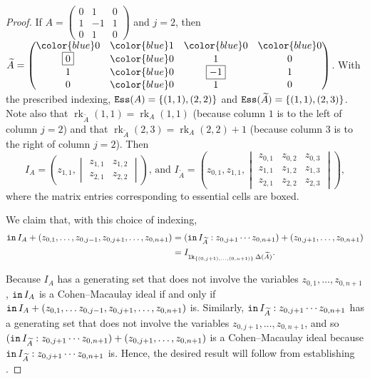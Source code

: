 \documentclass[12 pt]{amsart}
\DeclareMathOperator{\init}{{\tt in}}
\DeclareMathOperator{\lk}{{\tt lk}}
\DeclareMathOperator{\ess}{{\tt Ess}}
\DeclareMathOperator{\rk}{rk}
\theoremstyle{plain}
\newenvironment{example}
  {\pushQED{\qed}\renewcommand{\qedsymbol}{$\diamondsuit$}\examplex}
  {\popQED\endexamplex}
\theoremstyle{definition}
\theoremstyle{remark}
\begin{document}
{\begin{proof}
    \begin{example}
If $A = \begin{pmatrix}
        \boxed{0} & 1 & 0\\
        1 & \boxed{-1} & 1\\
        0 & 1 & 0
    \end{pmatrix}$ and $j=2$, then $\widetilde{A} = \begin{pmatrix}
          {\color{blue}0} & {\color{blue}1} & {\color{blue}0} & {\color{blue}0}\\
        \boxed{0} & {\color{blue}0} & 1 &  0\\
         1 & {\color{blue}0} & \boxed{-1}  & 1\\
        0 & {\color{blue}0} & 1  & 0
    \end{pmatrix}$.  With the prescribed indexing, $\ess(A) = \{(1,1),(2,2)\}$ and $\ess(\widetilde{A}) = \{(1,1),(2,3)\}$.  Note also that $\rk_{\widetilde{A}}(1,1) =\rk_A(1,1)$ (because column $1$ is to the left of column $j=2$) and that $\rk_{\widetilde{A}}(2,3) = \rk_A(2,2)+1$ (because column $3$ is to the right of column $j=2$).  Then \[
    I_A = \left(z_{1,1}, \begin{vmatrix} 
z_{1,1} & z_{1,2}\\
z_{2,1} & z_{2,2}
    \end{vmatrix}\right) \mbox{, and } I_{\widetilde{A}} = \left(z_{0,1},z_{1,1}, \begin{vmatrix} 
z_{0,1} & z_{0,2} & z_{0,3}\\
z_{1,1} & z_{1,2} & z_{1,3}\\
z_{2,1} & z_{2,2} & z_{2,3}
    \end{vmatrix}\right), 
    \] where the matrix entries corresponding to essential cells are boxed.
    \end{example}

    We claim that, with this choice of indexing, \begin{align}\label{CM-link-main-claim}
    \init I_A+(z_{0,1}, \ldots,z_{0,j-1}, z_{0,j+1}, \ldots,  z_{0,n+1}) &= (\init I_{\widetilde{A}}:z_{0,j+1}\cdots z_{0,n+1})+(z_{0,j+1}, \ldots, z_{0,n+1}) \\
    &= I_{\lk_{\{(0,j+1), \ldots, (0,n+1)\}}\Delta(\widetilde{A})}.\notag \end{align}  
    
    Because $I_A$ has a generating set that does not involve the variables $z_{0,1}, \ldots, z_{0,n+1}$, $\init I_A$ is a Cohen--Macaulay ideal if and only if $\init I_A+(z_{0,1}, \ldots z_{0,j-1}, z_{0,j+1}, \ldots , z_{0,n+1})$ is.  Similarly, $\init I_{\widetilde{A}}:z_{0,j+1}\cdots z_{0,n+1}$ has a generating set that does not involve the variables $z_{0,j+1}, \ldots, z_{0,n+1}$, and so $(\init I_{\widetilde{A}}:z_{0,j+1}\cdots z_{0,n+1})+(z_{0,j+1}, \ldots, z_{0,n+1})$ is a Cohen--Macaulay ideal because $\init I_{\widetilde{A}}:z_{0,j+1}\cdots z_{0,n+1}$ is.  Hence, the desired result will follow from establishing .


\end{proof}}
\end{document}
